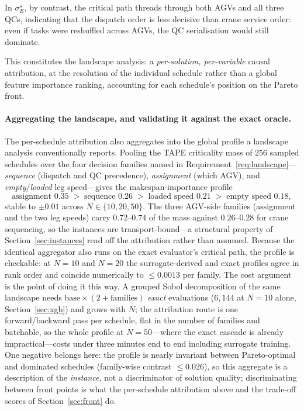 \documentclass[11pt]{article}
\begin{document}
In $\sigma^\star_E$, by contrast, the critical path threads through both AGVs and
all three QCs, indicating that the dispatch order is less decisive than crane service
order: even if tasks were reshuffled across AGVs, the QC serialisation would still
dominate.

This constitutes the landscape analysis: a \emph{per-solution, per-variable} causal
attribution, at the resolution of the individual schedule rather than a global feature
importance ranking, accounting for each schedule's position on the Pareto front.

\paragraph{Aggregating the landscape, and validating it against the exact oracle.}
The per-schedule attribution also aggregates into the global profile a landscape analysis
conventionally reports. Pooling the TAPE criticality mass of $256$ sampled schedules over
the four decision families named in Requirement~\ref{req:landscape}---\emph{sequence}
(dispatch and QC precedence), \emph{assignment} (which AGV), and \emph{empty}/\emph{loaded}
leg speed---gives the makespan-importance profile
\[
\text{assignment } 0.35 \;>\; \text{sequence } 0.26 \;>\; \text{loaded speed } 0.21 \;>\;
\text{empty speed } 0.18 ,
\]
stable to $\pm0.01$ across $N\in\{10,20,50\}$. The three AGV-side families (assignment and
the two leg speeds) carry $0.72$--$0.74$ of the mass against $0.26$--$0.28$ for crane
sequencing, so the instances are transport-bound---a structural property of
Section~\ref{sec:instances} read off the attribution rather than assumed. Because the
identical aggregator also runs on the exact evaluator's critical path, the profile is
checkable: at $N{=}10$ and $N{=}20$ the surrogate-derived and exact profiles agree in rank
order and coincide numerically to $\le\!0.0013$ per family. The cost argument is the
point of doing it this way. A grouped Sobol decomposition of the same landscape needs
$\mathrm{base}\times(2+\text{families})$ \emph{exact} evaluations ($6{,}144$ at
$N{=}10$ alone, Section~\ref{sec:xgb}) and grows with $N$; the attribution route is one
forward/backward pass per schedule, flat in the number of families and batchable, so the
whole profile at $N{=}50$---where the exact cascade is already impractical---costs under
three minutes end to end including surrogate training. One negative belongs here: the
profile is nearly invariant between Pareto-optimal and dominated schedules (family-wise
contrast $\le0.026$), so this aggregate is a description of the \emph{instance}, not a
discriminator of solution quality; discriminating between front points is what the
per-schedule attribution above and the trade-off scores of Section~\ref{sec:front} do.
\end{document}
